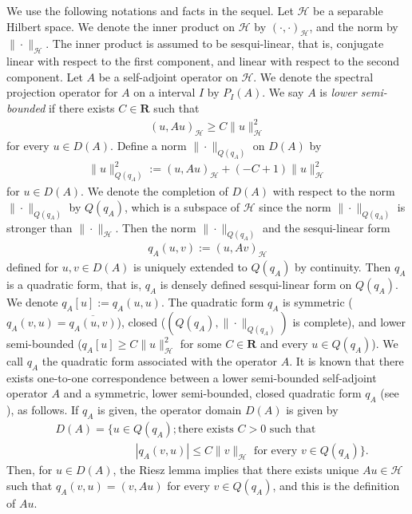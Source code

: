 \documentclass[12pt,a4paper]{article}
\begin{document}
We use the following notations and facts in the sequel.
Let $\mathcal{H}$ be a separable Hilbert space.
We denote the inner product on $\mathcal{H}$ by $(\cdot,\cdot)_{\mathcal{H}}$,
and the norm by $\|\cdot\|_\mathcal{H}$.
The inner product is assumed to be sesqui-linear,
that is,
conjugate linear with respect to the first component,
and linear with respect to the second component.
Let $A$ be a self-adjoint operator on $\mathcal{H}$.
We denote the spectral projection operator for $A$ on a interval $I$ 
by $P_I(A)$.
We say $A$ is \textit{lower semi-bounded} if there exists
$C\in \mathbf{R}$ such that
\begin{align*}
 (u,Au)_{\mathcal{H}}\geq C\|u\|_{\mathcal{H}}^2
\end{align*}
for every $u\in D(A)$.
Define a norm $\|\cdot\|_{Q(q_A)}$ on $D(A)$ by
\begin{align*}
 \|u\|_{Q(q_A)}^2:=(u,Au)_{\mathcal{H}}+(-C+1)\|u\|_{\mathcal{H}}^2
\end{align*}
for $u\in D(A)$.
We denote the completion of $D(A)$ with respect to the norm 
$\|\cdot\|_{Q(q_A)}$ by $Q(q_A)$,
which is a subspace of $\mathcal{H}$ since the norm $\|\cdot\|_{Q(q_A)}$
is stronger than $\|\cdot\|_{\mathcal{H}}$.
Then the norm $\|\cdot\|_{Q(q_A)}$ and the sesqui-linear form
\begin{align*}
 q_A(u,v):=(u,Av)_{\mathcal{H}}
\end{align*}
defined for $u,v\in D(A)$ is uniquely extended to $Q(q_A)$
by continuity.
Then $q_A$ is a quadratic form, that is,
$q_A$ is densely defined sesqui-linear form on $Q(q_A)$.
We denote $q_A[u]:=q_A(u,u)$.
The quadratic form $q_A$ is symmetric ($q_A(v,u)=\overline{q_A(u,v)}$),
closed ($(Q(q_A),\|\cdot\|_{Q(q_A)})$ is complete),
and lower semi-bounded ($q_A[u]\geq C\|u\|_\mathcal{H}^2$
for some $C\in \mathbf{R}$ and every $u\in Q(q_A)$).
We call $q_A$ the quadratic form associated with the operator $A$.
It is known that there exists one-to-one correspondence 
between a lower semi-bounded self-adjoint operator $A$
and a symmetric, lower semi-bounded, closed quadratic form $q_A$
(see \cite[section VIII.6]{Re-Si1}), as follows.
If $q_A$ is given, the operator domain $D(A)$ is given by
\begin{align*}
& D(A)=\{u\in Q(q_A);\mbox{there exists $C>0$ such that}\\
&\hspace{3cm} |q_A(v,u)|\leq C\|v\|_{\mathcal{H}}
\mbox{ for every }v\in Q(q_A)\}.
\end{align*}
Then, for $u\in D(A)$, the Riesz lemma implies that there exists
unique $Au\in \mathcal{H}$ such that $q_A(v,u)=(v,Au)$
for every $v\in Q(q_A)$,
and this is the definition of $Au$.
\end{document}
